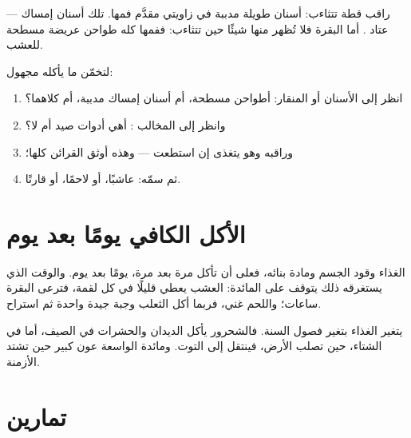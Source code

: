 \begin{example}\label{ex:g2:what-animals-eat:cat}
راقب قطة تتثاءب: أسنان طويلة مدببة في زاويتي مقدَّم فمها. تلك
أسنان إمساك --- عتاد . أما البقرة فلا تُظهر منها شيئًا حين
تتثاءب: ففمها كله طواحن عريضة مسطحة للعشب.
\end{example}

\begin{method}\label{met:g2:what-animals-eat:guess}
لتخمّن ما يأكله  مجهول:
\begin{enumerate}
  \item انظر إلى الأسنان أو المنقار: أطواحن مسطحة، أم أسنان إمساك
        مدببة، أم كلاهما؟
  \item وانظر إلى المخالب : أهي أدوات صيد أم لا؟
  \item وراقبه وهو يتغذى إن استطعت --- وهذه أوثق القرائن كلها؛
  \item ثم سمّه: عاشبًا، أو لاحمًا، أو قارتًا.
\end{enumerate}
\end{method}

\section{الأكل الكافي يومًا بعد يوم}

\begin{proposition}\label{prop:g2:what-animals-eat:daily}
الغذاء وقود الجسم ومادة بنائه، فعلى  أن تأكل مرة بعد
مرة، يومًا بعد يوم. والوقت الذي يستغرقه ذلك يتوقف على المائدة:
العشب يعطي قليلًا في كل لقمة، فترعى البقرة ساعات؛ واللحم غني،
فربما أكل الثعلب وجبة جيدة واحدة ثم استراح.
\end{proposition}
\admitted

\begin{example}\label{ex:g2:what-animals-eat:winter}
يتغير الغذاء بتغير فصول السنة. فالشحرور يأكل الديدان والحشرات في
الصيف، أما في الشتاء، حين تصلب الأرض، فينتقل إلى التوت. ومائدة
 الواسعة عون كبير حين تشتد الأزمنة.
\end{example}

\section{تمارين}

